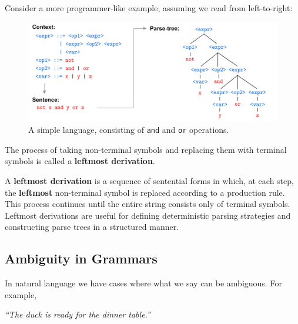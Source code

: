     \vspace{-.5em}
    \noindent
        Consider a more programmer-like example, assuming we read from left-to-right:

        \begin{figure}[h]
            \centering
            \includegraphics[width=1\textwidth]{Sections/Formal/bnf2.png}
            \caption{A simple language, consisting of \texttt{and} and \texttt{or} operations.}
            \label{fig:bnf2}
        \end{figure}

\newpage

\noindent
The process of taking non-terminal symbols and replacing them with terminal symbols is called a \textbf{leftmost derivation}.
\begin{Def}

    A \textbf{leftmost derivation} is a sequence of sentential forms in which, at each step, the \textbf{leftmost} non-terminal symbol is replaced according to a production rule. This process continues until the entire string consists only of terminal symbols. Leftmost derivations are useful for defining deterministic parsing strategies and constructing parse trees in a structured manner.
    
\end{Def}
    
\subsection{Ambiguity in Grammars}

In natural language we have cases where what we say can be ambiguous. For example,
\begin{center}
    \textit
    {``The duck is ready for the dinner table.''}
\end{center}

